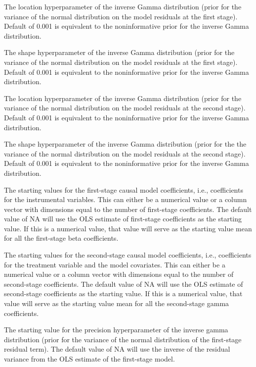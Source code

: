 \documentclass[a4paper]{book}
\begin{document}
\begin{Arguments}
\begin{ldescription}
\item[\code{u0}] The location hyperparameter of the inverse Gamma distribution (prior for the variance of the
normal distribution on the model residuals at the first stage).
Default of 0.001 is equivalent to the noninformative prior for the inverse Gamma distribution.

\item[\code{U0}] The shape hyperparameter of the inverse Gamma distribution (prior for the variance of the
normal distribution on the model residuals at the first stage).
Default of 0.001 is equivalent to the noninformative prior for the inverse Gamma distribution.

\item[\code{e0}] The location hyperparameter of the inverse Gamma distribution (prior for the variance of the
normal distribution on the model residuals at the second stage).
Default of 0.001 is equivalent to the noninformative prior for the inverse Gamma distribution.

\item[\code{E0}] The shape hyperparameter of the inverse Gamma distribution (prior for the the variance of the
normal distribution on the model residuals at the second stage).
Default of 0.001 is equivalent to the noninformative prior for the inverse Gamma distribution.

\item[\code{beta.start}] The starting values for the first-stage causal model coefficients,
i.e., coefficients for the instrumental variables.
This can either be a numerical value or a column vector with dimensions
equal to the number of first-stage coefficients.
The default value of NA will use the OLS estimate of first-stage coefficients as the starting value.
If this is a numerical value, that value will
serve as the starting value mean for all the first-stage beta coefficients.

\item[\code{gamma.start}] The starting values for the second-stage causal model coefficients,
i.e., coefficients for the treatment variable and the model covariates.
This can either be a numerical value or a column vector with dimensions
equal to the number of second-stage coefficients.
The default value of NA will use the OLS estimate of second-stage coefficients as the starting value.
If this is a numerical value, that value will
serve as the starting value mean for all the second-stage gamma coefficients.

\item[\code{u.start}] The starting value for the precision hyperparameter of the inverse gamma distribution
(prior for the variance of the normal distribution of the first-stage residual term).
The default value of NA will use the inverse of the residual variance from the OLS estimate of the first-stage model.


\end{ldescription}
\end{Arguments}
\end{document}
